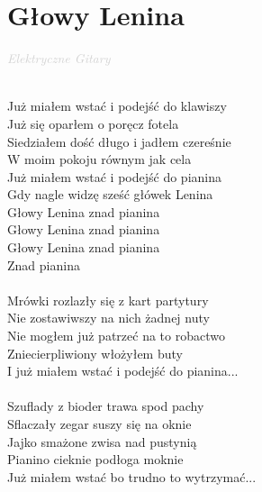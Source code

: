 \documentclass[a5paper, 10pt]{book}
\begin{document}
\newpage
\section{Głowy Lenina}\textcolor{lightgray}{\textit{Elektryczne Gitary}}\\~\\
\begin{minipage}[t]{0.6\textwidth}
Już miałem wstać i podejść do klawiszy\\
Już się oparłem o poręcz fotela\\
Siedziałem dość długo i jadłem czereśnie\\
W moim pokoju równym jak cela\\

\hspace*{5mm}Już miałem wstać i podejść do pianina\\
\hspace*{5mm}Gdy nagle widzę sześć główek Lenina\\
\hspace*{5mm}Głowy Lenina znad pianina\\
\hspace*{5mm}Głowy Lenina znad pianina\\
\hspace*{5mm}Głowy Lenina znad pianina\\
\hspace*{5mm}Znad pianina\\
\\
Mrówki rozlazły się z kart partytury\\
Nie zostawiwszy na nich żadnej nuty\\
Nie mogłem już patrzeć na to robactwo\\
Zniecierpliwiony włożyłem buty\\

\hspace*{5mm}I już miałem wstać i podejść do pianina...\\
\\
Szuflady z bioder trawa spod pachy\\
Sflaczały zegar suszy się na oknie\\
Jajko smażone zwisa nad pustynią\\
Pianino cieknie podłoga moknie\\

\hspace*{5mm}Już miałem wstać bo trudno to wytrzymać...\\
\end{minipage}
\end{document}
